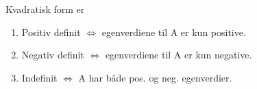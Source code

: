 Kvadratisk form er
\begin{enumerate}
  \item Positiv definit $\iff$ egenverdiene til A er kun positive.
  \item Negativ definit $\iff$ egenverdiene til A er kun negative.
  \item Indefinit $\iff$ A har både pos. og neg. egenverdier.
\end{enumerate}
